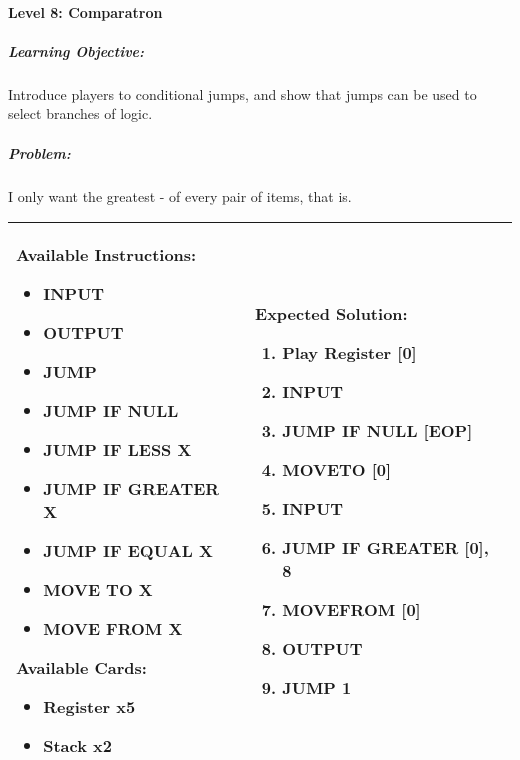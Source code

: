 \paragraph{Level 8: Comparatron}
\subparagraph{Learning Objective:} Introduce players to conditional jumps, and show that jumps can be used to select branches of logic.

\subparagraph{Problem:} I only want the greatest - of every pair of items, that is.

\begin{center}
    \begin{tabular}{ | m{5cm} | m{9cm} | } 
        \hline
            \textbf{Available Instructions:} 
            \begin{itemize}
                \setlength\itemsep{-.35em}
                \item INPUT
                \item OUTPUT
                \item JUMP
                \item JUMP IF NULL
                \item JUMP IF LESS X
                \item JUMP IF GREATER X
		\item JUMP IF EQUAL X
                \item MOVE TO X
                \item MOVE FROM X
            \end{itemize}
            \textbf{Available Cards:} 
            \begin{itemize}
                \setlength\itemsep{-.35em}
                \item Register x5
                \item Stack x2
            \end{itemize}& 
            \textbf{Expected Solution:} 
            \begin{enumerate}
                \setlength\itemsep{-.35em}
                \item Play Register [0]
                \item INPUT
		\item JUMP IF NULL [EOP]
                \item MOVETO [0]
                \item INPUT
                \item JUMP IF GREATER [0], 8
                \item MOVEFROM [0]
                \item OUTPUT
		\item JUMP 1
            \end{enumerate}
            \\
        \hline
    \end{tabular}
\end{center}


